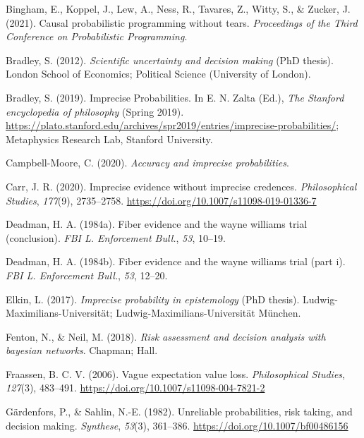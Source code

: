 \documentclass[
  10pt,
  dvipsnames,enabledeprecatedfontcommands]{scrartcl}
\newlength{\cslhangindent}
\newenvironment{CSLReferences}[2] %
 {\begin{list}{}{%
  \setlength{\itemindent}{0pt}
  \setlength{\leftmargin}{0pt}
  \setlength{\parsep}{0pt}
  \ifodd #1
   \setlength{\leftmargin}{\cslhangindent}
   \setlength{\itemindent}{-1\cslhangindent}
  \fi
  \setlength{\itemsep}{#2\baselineskip}}}
 {\end{list}}
\begin{document}
\label{refs}
\begin{CSLReferences}{1}{0}
Bingham, E., Koppel, J., Lew, A., Ness, R., Tavares, Z., Witty, S., \&
Zucker, J. (2021). Causal probabilistic programming without tears.
\emph{Proceedings of the Third Conference on Probabilistic Programming}.

Bradley, S. (2012). \emph{Scientific uncertainty and decision making}
(PhD thesis). London School of Economics; Political Science (University
of London).

Bradley, S. (2019). {Imprecise Probabilities}. In E. N. Zalta (Ed.),
\emph{The {Stanford} encyclopedia of philosophy} ({S}pring 2019).
\url{https://plato.stanford.edu/archives/spr2019/entries/imprecise-probabilities/};
Metaphysics Research Lab, Stanford University.

Campbell-Moore, C. (2020). \emph{Accuracy and imprecise probabilities}.

Carr, J. R. (2020). Imprecise evidence without imprecise credences.
\emph{Philosophical Studies}, \emph{177}(9), 2735--2758.
\url{https://doi.org/10.1007/s11098-019-01336-7}

Deadman, H. A. (1984a). Fiber evidence and the wayne williams trial
(conclusion). \emph{FBI L. Enforcement Bull.}, \emph{53}, 10--19.

Deadman, H. A. (1984b). Fiber evidence and the wayne williams trial
(part i). \emph{FBI L. Enforcement Bull.}, \emph{53}, 12--20.

Elkin, L. (2017). \emph{Imprecise probability in epistemology} (PhD
thesis). Ludwig-Maximilians-Universit{ä}t;
Ludwig-Maximilians-Universität München.

Fenton, N., \& Neil, M. (2018). \emph{Risk assessment and decision
analysis with bayesian networks}. Chapman; Hall.

Fraassen, B. C. V. (2006). Vague expectation value loss.
\emph{Philosophical Studies}, \emph{127}(3), 483--491.
\url{https://doi.org/10.1007/s11098-004-7821-2}

Gärdenfors, P., \& Sahlin, N.-E. (1982). Unreliable probabilities, risk
taking, and decision making. \emph{Synthese}, \emph{53}(3), 361--386.
\url{https://doi.org/10.1007/bf00486156}


\end{CSLReferences}
\end{document}
